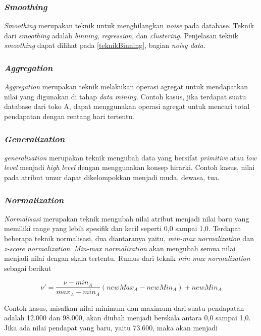 \subsubsection{\textsl{Smoothing}}
\textsl{Smoothing} merupakan teknik untuk menghilangkan \textsl{noise} pada database. Teknik dari \textsl{smoothing} adalah \textsl{binning}, \textsl{regression}, dan \textsl{clustering}. Penjelasan teknik \textsl{smoothing} dapat dilihat pada \ref{teknikBinning}, bagian \textsl{noisy data}.

\subsubsection{\textsl{Aggregation}}
\textsl{Aggregation} merupakan teknik melakukan operasi agregat untuk mendapatkan nilai yang digunakan di tahap \textsl{data mining}. Contoh kasus, jika terdapat suatu database dari toko A, dapat menggunakan operasi agregat untuk mencari total pendapatan dengan rentang hari tertentu.

\subsubsection{\textsl{Generalization}}	
\textsl{generalization} merupakan teknik mengubah data yang bersifat \textsl{primitive} atau \textsl{low level} menjadi \textsl{high level} dengan menggunakan konsep hirarki. Contoh kasus, nilai pada atribut umur dapat dikelompokkan menjadi muda, dewasa, tua.	
	
\subsubsection{\textsl{Normalization}}
\textsl{Normalisasi} merupakan teknik mengubah nilai atribut menjadi nilai baru yang memiliki range yang lebih spesifik dan kecil seperti 0,0 sampai 1,0.
Terdapat beberapa teknik normalisasi, dua diantaranya yaitu, \textsl{min-max normalization} dan \textsl{z-score normalization}. \textsl{Min-max normalization} akan mengubah semua nilai menjadi nilai dengan skala tertentu. Rumus dari teknik \textsl{min-max normalization} sebagai berikut

\begin{displaymath}
	\nu' = \frac{\nu-min_{A}}{max_{A}-min_{A}}(newMax_{A}-newMin_{A})+newMin_{A}	
\end{displaymath}

Contoh kasus, misalkan nilai minimum dan maximum dari suatu pendapatan adalah 12.000 dan 98.000, akan diubah menjadi berskala antara 0,0 sampai 1,0. Jika ada nilai pendapat yang baru, yaitu 73.600, maka akan menjadi

